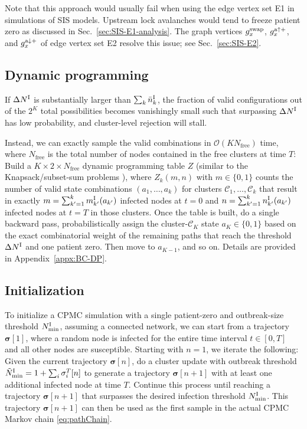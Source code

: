 \documentclass[english,10pt,aps,pra,twocolumn,superscriptaddress,floatfix,fleqn]{revtex4-2}
\newcommand{\mc}[1]{\mathcal{#1}}
\renewcommand{\vec}[1]{{\boldsymbol{#1}}}
\newcommand{\C} {\mc{C}}
\renewcommand{\O} {\mc{O}}
\newcommand{\vs}{\vec{\sigma}}
\newcommand{\tI}{\textnormal{I}}
\newcommand{\ta}{\textnormal{a}}
\newcommand{\swap}{\textnormal{swap}}
\let\up\uparrow
\let\dw\downarrow
\begin{document}
Note that this approach would usually fail when using the edge vertex set \textsc{E1} in simulations of SIS models. Upstream lock avalanches would tend to freeze patient zero as discussed in Sec.~\ref{sec:SIS-E1-analysis}. The graph vertices $g^\swap_x$, $g^{\ta\up+}_x$, and $g^{\ta\dw+}_x$ of edge vertex set \textsc{E2} resolve this issue; see Sec.~\ref{sec:SIS-E2}.

\subsection{Dynamic programming}\label{sec:BC-DP}
If $\Delta N^\tI$ is substantially larger than $\sum_k \bar{n}^\tI_k$, the fraction of valid configurations out of the $2^K$ total possibilities becomes vanishingly small such that surpassing $\Delta N^\tI$ has low probability, and cluster-level rejection will stall.

Instead, we can exactly sample the valid combinations in $\O(KN_\text{free})$ time, where $N_\text{free}$ is the total number of nodes contained in the free clusters at time $T$: Build a $K\times 2\times N_\text{free}$ dynamic programming table $Z$ (similar to the Knapsack/subset-sum problems \cite{Martello1990,Kellerer2004}), where $Z_k(m,n)$ with $m\in\{0,1\}$ counts the number of valid state combinations $(a_1,\dotsc,a_k)$ for clusters $\C_1,\dotsc,\C_k$ that result in exactly $m=\sum_{k'=1}^k m^\tI_{k'}(a_{k'})$ infected nodes at $t=0$ and $n=\sum_{k'=1}^k n^\tI_{k'}(a_{k'})$ infected nodes at $t=T$ in those clusters. Once the table is built, do a single backward pass, probabilistically assign the cluster-$\C_K$ state $a_K\in\{0,1\}$ based on the exact combinatorial weight of the remaining paths that reach the threshold $\Delta N^\tI$ and one patient zero. Then move to $a_{K-1}$, and so on. Details are provided in Appendix~\ref{appx:BC-DP}.

\subsection{Initialization}\label{sec:BC-init}
To initialize a CPMC simulation with a single patient-zero and outbreak-size threshold $N^\tI_{\min}$, assuming a connected network, we can start from a trajectory $\vs[1]$, where a random node is infected for the entire time interval $t\in[0,T]$ and all other nodes are susceptible. Starting with $n=1$, we iterate the following:
Given the current trajectory $\vs[n]$, do a cluster update with outbreak threshold $\tilde{N}^\tI_{\min}=1+\sum_i \sigma_i^T[n]$ to generate a trajectory $\vs[n+1]$ with at least one additional infected node at time $T$. Continue this process until reaching a trajectory $\vs[n+1]$ that surpasses the desired infection threshold $N^\tI_{\min}$. This trajectory $\vs[n+1]$ can then be used as the first sample in the actual CPMC Markov chain \eqref{eq:pathChain}.
\end{document}
